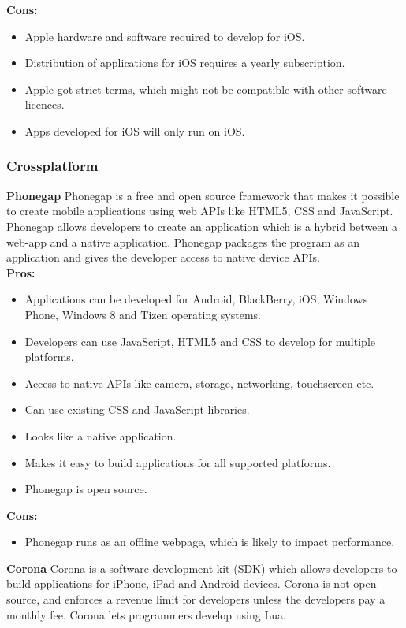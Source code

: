 \indent
  {\bf Cons:}
  \begin{itemize}
    \item Apple hardware and software required to develop for iOS.
    \item Distribution of applications for iOS requires a yearly subscription.
    \item Apple got strict terms, which might not be compatible with other software licences.
    \item Apps developed for iOS will only run on iOS.
  \end{itemize}


\subsubsection{Crossplatform}
{\bf Phonegap}
Phonegap is a free and open source framework that makes it possible to create mobile 
applications using web APIs like HTML5, CSS and JavaScript. Phonegap allows developers 
to create an application which is a hybrid between a web-app and a native application. 
Phonegap packages the program as an application and gives the developer access to native 
device APIs. \\

\indent
  {\bf Pros:}
  \begin{itemize}
    \item Applications can be developed for Android, BlackBerry, iOS, Windows Phone, 
    Windows 8 and Tizen operating systems.
    \item Developers can use JavaScript, HTML5 and CSS to develop for multiple platforms.
    \item Access to native APIs like camera, storage, networking, touchscreen etc.
    \item Can use existing CSS and JavaScript libraries.
    \item Looks like a native application.
    \item Makes it easy to build applications for all supported platforms.
    \item Phonegap is open source.
  \end{itemize}

\indent
{\bf Cons:}
  \begin{itemize}
    \item Phonegap runs as an offline webpage, which is likely to impact performance.
  \end{itemize}

\noindent
{\bf Corona}
Corona is a software development kit (SDK) which allows developers to build applications 
for iPhone, iPad and Android devices. Corona is not open source, and enforces a revenue 
limit for developers unless the developers pay a monthly fee. Corona lets programmers 
develop using Lua. \\

